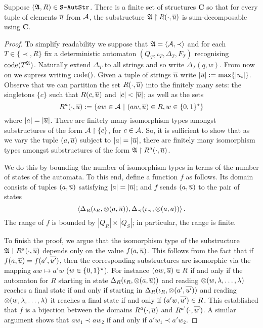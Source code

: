\begin{theorem} \label{AS:thm:sumaug}
Suppose $(\mathfrak{A},R) \in \mbox{\tt S-AutStr}$.
There is a finite set of
structures $\mathbf{C}$ so that for every tuple of elements $\mbox{$\overline {u}$}$ from ${\mathcal A}$, the
substructure ${\mathfrak{A}} \restriction R(\cdot,\mbox{$\overline {u}$})$ is sum-decomposable using $\mathbf{C}$.
\end{theorem}

\begin{proof}
To simplify readability we suppose that $\mathfrak{A} = \left<{\mathcal A}, \prec \right>$ and for each $T \in \{\prec,R\}$ fix a deterministic automaton  $(Q_T,\iota_T,\Delta_T,F_T)$ recognising ${\rm code}({T^{\mathfrak{A}}})$. Naturally extend $\Delta_T$ to all strings and so write
$\Delta_T(q,w)$. From now on we supress writing ${\rm code}({})$.
Given a tuple of strings $\mbox{$\overline {u}$}$ write $|\mbox{$\overline {u}$}| := \max\{|u_i|\}$. Observe that we can partition the set $R(\cdot,\mbox{$\overline {u}$})$
into the finitely many sets: the singletons $\{c\}$ such that $R(c,\mbox{$\overline {u}$})$ and  $|c| <
|\mbox{$\overline {u}$}|$; as well as the sets 
\[
R^{a}(\cdot,\mbox{$\overline {u}$}) := \{aw \in {\mathcal A} \ \vert \  (aw,\mbox{$\overline {u}$}) \in R, w \in \{0,1\}^\star\}
\]
where $|a| = |\mbox{$\overline {u}$}|$. There are finitely
many isomorphism types amongst substructures of the form ${{\mathcal A}} \restriction
\{c\}$, for $c \in {\mathcal A}$. So, it is sufficient to show that as we vary the tuple
$(a,\mbox{$\overline {u}$})$ subject to $|a| = |\mbox{$\overline {u}$}|$, there are finitely many isomorphism
types amongst substructures of the form $\mathfrak{A} \restriction R^{a }(\cdot,\mbox{$\overline {u}$})$.

We do this by bounding the number of isomorphism types in terms of the number
of states of the automata. To this end, define a function $f$ as
follows. Its domain consists of tuples $(a,\mbox{$\overline {u}$})$ satisfying $|a| = |\mbox{$\overline {u}$}|$; and $f$ sends $(a,\mbox{$\overline {u}$})$ to the pair of states
$$
\left<
\Delta_R(\iota_R,\otimes(a,\mbox{$\overline {u}$})),
\Delta_\prec(\iota_\prec,\otimes(a,a) ) \right>.
$$
The range of $f$ is bounded by $|Q_R| \times |Q_S|$; in particular, the range is finite.

To finish the proof, we argue that the isomorphism type of the
substructure $\mathfrak{A} \restriction R^{a }(\cdot,\mbox{$\overline {u}$})$ depends
only on the value $f(a,\mbox{$\overline {u}$})$. This follows from the fact that if
$f(a,\mbox{$\overline {u}$}) = f(a',\mbox{$\overline {u'}$})$, then the corresponding substructures
are isomorphic via the mapping $aw \mapsto a'w$ ($w \in \{0,1\}^\star$).
For instance $(aw,\mbox{$\overline {u}$}) \in R$ if and only if the automaton for $R$ starting in state
$\Delta_R(\iota_R,\otimes(a,\mbox{$\overline {u}$}))$ and reading $\otimes(w,\lambda,\dots,\lambda)$ reaches
a final state if and only if starting in $\Delta_R(\iota_R,\otimes(a',\mbox{$\overline {u'}$}))$ and reading $\otimes(w,\lambda,\dots,\lambda)$
it reaches a final state if and only if $(a'w,\mbox{$\overline {u'}$}) \in R$. This established that $f$ is a bijection between the domains
$R^{a}(\cdot,\mbox{$\overline {u}$})$ and $R^{a'}(\cdot,\mbox{$\overline {u'}$})$.
A similar argument shows that $aw_1 \prec aw_2$ if and only if $a'w_1 \prec a'w_2$.
\end{proof}


